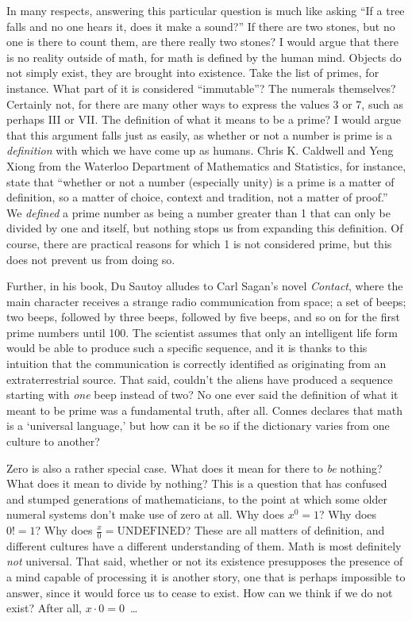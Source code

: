 \documentclass{mathbook}
\begin{document}
    In many respects, answering this particular question is much like asking ``If a tree falls and no one hears it, does it make a sound?'' If there are two stones, but no one is there to count them, are there really two stones? I would argue that there is no reality outside of math, for math is defined by the human mind. Objects do not simply exist, they are brought into existence. Take the list of primes, for instance. What part of it is considered ``immutable''? The numerals themselves? Certainly not, for there are many other ways to express the values 3 or 7, such as perhaps III or VII. The definition of what it means to be a prime? I would argue that this argument falls just as easily, as whether or not a number is prime is a \emph{definition} with which we have come up as humans. Chris K. Caldwell and Yeng Xiong from the Waterloo Department of Mathematics and Statistics, for instance, state that ``whether or not a number (especially unity) is a prime is a matter of definition, so a matter of choice, context and tradition, not a matter of proof.'' \cite{Caldwell2012} We \emph{defined} a prime number as being a number greater than 1 that can only be divided by one and itself, but nothing stops us from expanding this definition. Of course, there are practical reasons for which 1 is not considered prime, but this does not prevent us from doing so. \par
    
    Further, in his book, Du Sautoy alludes to Carl Sagan's novel \emph{Contact}, where the main character receives a strange radio communication from space; a set of beeps; two beeps, followed by three beeps, followed by five beeps, and so on for the first prime numbers until 100. The scientist assumes that only an intelligent life form would be able to produce such a specific sequence, and it is thanks to this intuition that the communication is correctly identified as originating from an extraterrestrial source. That said, couldn't the aliens have  produced a sequence starting with \emph{one} beep instead of two? No one ever said the definition of what it meant to be prime was a fundamental truth, after all. Connes declares that math is a `universal language,' but how can it be so if the dictionary varies from one culture to another? \par

    Zero is also a rather special case. What does it mean for there to \emph{be} nothing? What does it mean to divide by nothing? This is a question that has confused and stumped generations of mathematicians, to the point at which some older numeral systems don't make use of zero at all. Why does $x^0=1$? Why does $0!=1$? Why does $\frac{x}{0}=\text{UNDEFINED}$? These are all matters of definition, and different cultures have a different understanding of them. Math is most definitely \emph{not} universal. That said, whether or not its existence presupposes the presence of a mind capable of processing it is another story, one that is perhaps impossible to answer, since it would force us to cease to exist. How can we think if we do not exist? After all, \(x \cdot 0 = 0\)~\dots
\end{document}
